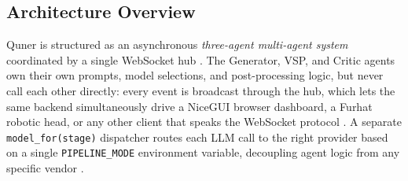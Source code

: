 \documentclass{article}
\begin{document}
\subsection{Architecture Overview}

Quner is structured as an asynchronous \emph{three-agent multi-agent system} coordinated by a single WebSocket hub \cite{Cheptsov2013IntroducingAN}. The Generator, VSP, and Critic agents own their own prompts, model selections, and post-processing logic, but never call each other directly: every event is broadcast through the hub, which lets the same backend simultaneously drive a NiceGUI browser dashboard, a Furhat robotic head, or any other client that speaks the WebSocket protocol \cite{Rygl2017SemanticVE}. A separate \texttt{model\_for(stage)} dispatcher routes each LLM call to the right provider based on a single \texttt{PIPELINE\_MODE} environment variable, decoupling agent logic from any specific vendor \cite{Kulkarni2023TheEO}.
\end{document}
